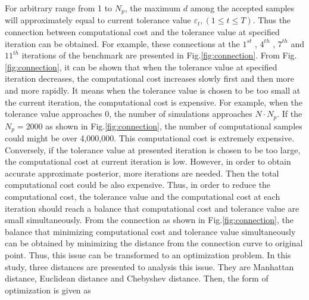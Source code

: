 \documentclass[review]{elsarticle}
\begin{document}
For arbitrary range from 1 to $N_p$, the maximum $d$ among the accepted samples will approximately equal to current tolerance value $\varepsilon_t, (1\leq t \leq T)$. Thus the connection between computational cost and the tolerance value at specified iteration can be obtained. For example, these connections at the $1^{st}$ , $4^{th}$ , $7^{th}$  and $11^{th}$ iterations of the benchmark are presented in Fig.\ref{fig:connection}. From Fig.\ref{fig:connection}, it can be shown that when the tolerance value at specified iteration decreases, the computational cost increases slowly first and then more and more rapidly. It means when the tolerance value is chosen to be too small at the current iteration, the computational cost is expensive. For example, when the tolerance value approaches 0, the number of simulations approaches $N\cdot N_p$. If the $N_p = 2000$ as shown in Fig.\ref{fig:connection}, the number of computational samples could might be over 4,000,000. This computational cost is extremely expensive. Conversely, if the tolerance value at presented iteration is chosen to be too large, the computational cost at current iteration is low. However, in order to obtain accurate approximate posterior, more iterations are needed. Then the total computational cost could be also expensive. Thus, in order to reduce the computational cost, the tolerance value and the computational cost at each iteration should reach a balance that computational cost and tolerance value are small simultaneously. From the connection as shown in Fig.\ref{fig:connection}, the balance that minimizing computational cost and tolerance value simultaneously can be obtained by minimizing the distance from the connection curve to original point. Thus, this issue can be transformed to an optimization problem. In this study, three distances are presented to analysis this issue. They are Manhattan distance, Euclidean distance and Chebyshev distance. Then, the form of optimization is given as
\end{document}
